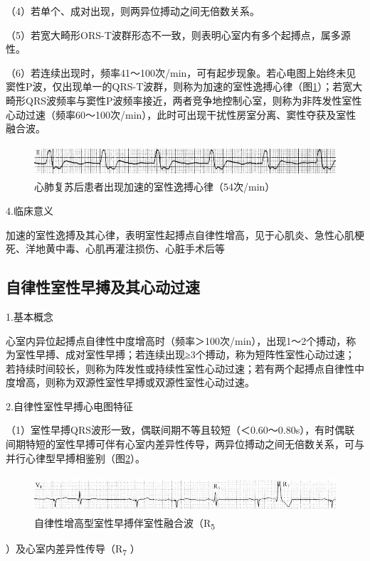 （4）若单个、成对出现，则两异位搏动之间无倍数关系。

（5）若宽大畸形ORS-T波群形态不一致，则表明心室内有多个起搏点，属多源性。

（6）若连续出现时，频率41～100次/min，可有起步现象。若心电图上始终未见窦性P波，仅出现单一的QRS-T波群，则称为加速的室性逸搏心律（图\ref{fig15-8}）；若宽大畸形QRS波频率与窦性P波频率接近，两者竞争地控制心室，则称为非阵发性室性心动过速（频率60～100次/min），此时可出现干扰性房室分离、窦性夺获及室性融合波。

\begin{figure}[!htbp]
 \centering
 \includegraphics[width=5.58333in,height=0.45833in]{./images/Image00274.jpg}
 \captionsetup{justification=centering}
 \caption{心肺复苏后患者出现加速的室性逸搏心律（54次/min）}
 \label{fig15-8}
  \end{figure} 

4.临床意义

加速的室性逸搏及其心律，表明室性起搏点自律性增高，见于心肌炎、急性心肌梗死、洋地黄中毒、心肌再灌注损伤、心脏手术后等

\protect\hypertarget{text00022.htmlux5cux23subid272}{}{}

\subsection{自律性室性早搏及其心动过速}

1.基本概念

心室内异位起搏点自律性中度增高时（频率＞100次/min），出现1～2个搏动，称为室性早搏、成对室性早搏；若连续出现≥3个搏动，称为短阵性室性心动过速；若持续时间较长，则称为阵发性或持续性室性心动过速；若有两个起搏点自律性中度增高，则称为双源性室性早搏或双源性室性心动过速。

2.自律性室性早搏心电图特征

（1）室性早搏QRS波形一致，偶联间期不等且较短（＜0.60～0.80s），有时偶联间期特短的室性早搏可伴有心室内差异性传导，两异位搏动之间无倍数关系，可与并行心律型早搏相鉴别（图\ref{fig15-9}）。

\begin{figure}[!htbp]
 \centering
 \includegraphics[width=5.58333in,height=0.55208in]{./images/Image00275.jpg}
 \captionsetup{justification=centering}
 \caption{自律性增高型室性早搏伴室性融合波（R\textsubscript{5}}
 \label{fig15-9}
  \end{figure} 
）及心室内差异性传导（R\textsubscript{7} ）

